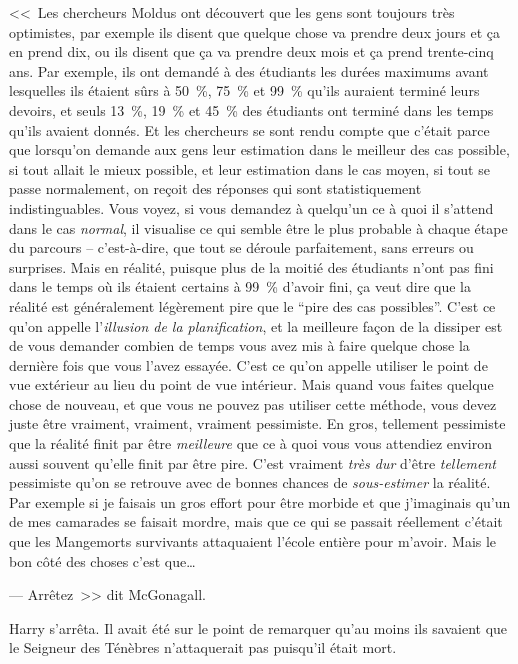 <<~Les chercheurs Moldus ont découvert que les gens sont toujours très optimistes, par exemple ils disent que quelque chose va prendre deux jours et ça en prend dix, ou ils disent que ça va prendre deux mois et ça prend trente-cinq ans. Par exemple, ils ont demandé à des étudiants les durées maximums avant lesquelles ils étaient sûrs à 50~\%, 75~\% et 99~\% qu'ils auraient terminé leurs devoirs, et seuls 13~\%, 19~\% et 45~\% des étudiants ont terminé dans les temps qu'ils avaient donnés. Et les chercheurs se sont rendu compte que c'était parce que lorsqu'on demande aux gens leur estimation dans le meilleur des cas possible, si tout allait le mieux possible, et leur estimation dans le cas moyen, si tout se passe normalement, on reçoit des réponses qui sont statistiquement indistinguables. Vous voyez, si vous demandez à quelqu'un ce à quoi il s'attend dans le cas \emph{normal}, il visualise ce qui semble être le plus probable à chaque étape du parcours -- c'est-à-dire, que tout se déroule parfaitement, sans erreurs ou surprises. Mais en réalité, puisque plus de la moitié des étudiants n'ont pas fini dans le temps où ils étaient certains à 99~\% d'avoir fini, ça veut dire que la réalité est généralement légèrement pire que le “pire des cas possibles”. C'est ce qu'on appelle l'\emph{illusion de la planification}, et la meilleure façon de la dissiper est de vous demander combien de temps vous avez mis à faire quelque chose la dernière fois que vous l'avez essayée. C'est ce qu'on appelle utiliser le point de vue extérieur au lieu du point de vue intérieur. Mais quand vous faites quelque chose de nouveau, et que vous ne pouvez pas utiliser cette méthode, vous devez juste être vraiment, vraiment, vraiment pessimiste. En gros, tellement pessimiste que la réalité finit par être \emph{meilleure} que ce à quoi vous vous attendiez environ aussi souvent qu'elle finit par être pire. C'est vraiment \emph{très dur} d'être \emph{tellement} pessimiste qu'on se retrouve avec de bonnes chances de \emph{sous-estimer} la réalité. Par exemple si je faisais un gros effort pour être morbide et que j'imaginais qu'un de mes camarades se faisait mordre, mais que ce qui se passait réellement c'était que les Mangemorts survivants attaquaient l'école entière pour m'avoir. Mais le bon côté des choses c'est que…

--- Arrêtez~>> dit McGonagall.

Harry s'arrêta. Il avait été sur le point de remarquer qu'au moins ils savaient que le Seigneur des Ténèbres n'attaquerait pas puisqu'il était mort.


